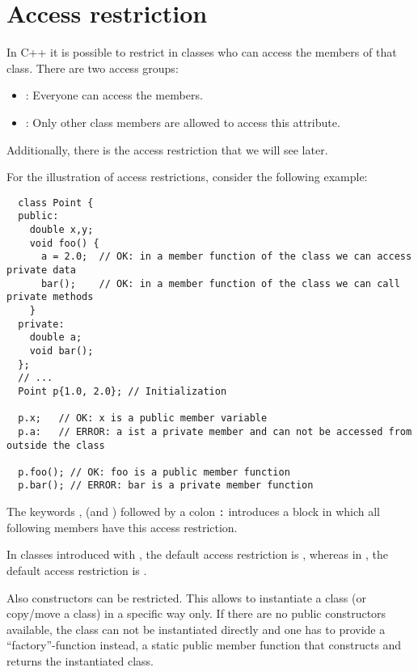 \section{Access restriction\label{sec:access-restriction}}
In C++ it is possible to restrict in classes who can access the members of that class. There are two access groups:
\begin{itemize}
	\item {}: Everyone can access the members.
	\item {}: Only other class members are allowed to access this attribute.
\end{itemize}
Additionally, there is the access restriction  that we will see later.

\begin{example}
  For the illustration of access restrictions, consider the following example:
  \begin{verbatim}
  class Point {
  public:
    double x,y;
    void foo() {
      a = 2.0;  // OK: in a member function of the class we can access private data
      bar();    // OK: in a member function of the class we can call private methods
    }
  private:
    double a;
    void bar();
  };
  // ...
  Point p{1.0, 2.0}; // Initialization

  p.x;   // OK: x is a public member variable
  p.a:   // ERROR: a ist a private member and can not be accessed from outside the class

  p.foo(); // OK: foo is a public member function
  p.bar(); // ERROR: bar is a private member function
  \end{verbatim}
\end{example}

The keywords ,  (and ) followed by a colon \texttt{:} introduces a block in which all following members
have this access restriction.

\begin{rem}
  In classes introduced with , the default access restriction is , whereas in , the default access restriction is
  .
\end{rem}

\begin{rem}
  Also constructors can be restricted. This allows to instantiate a class (or copy/move a class) in a specific way only. If there are no public
  constructors available, the class can not be instantiated directly and one has to provide a ``factory''-function instead, \ie a static public
  member function that constructs and returns the instantiated class.
\end{rem}


